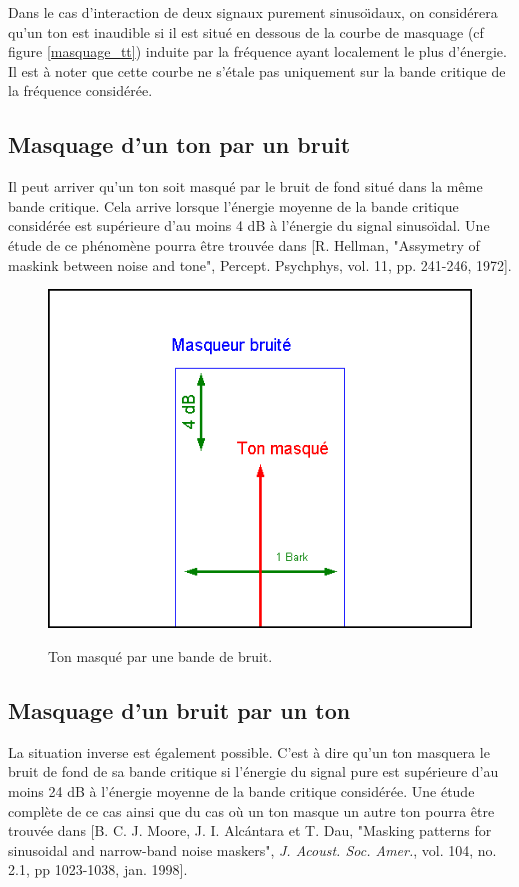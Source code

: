     Dans le cas d'interaction de deux signaux purement sinuso{\"\i}daux,
    on consid{\'e}rera qu'un ton est inaudible si il est situ{\'e} en
    dessous de la courbe de masquage (cf figure \ref{masquage_tt})
    induite par la fr{\'e}quence ayant localement le plus d'{\'e}nergie.
    Il est {\`a} noter que cette courbe ne s'{\'e}tale pas uniquement sur
    la bande critique de la fr{\'e}quence consid{\'e}r{\'e}e.


    \newpage
    \subsection{Masquage d'un ton par un bruit}
    Il peut arriver qu'un ton soit masqu{\'e} par le bruit de fond
    situ{\'e} dans la m{\^e}me bande critique. Cela arrive lorsque
    l'{\'e}nergie moyenne de la bande critique consid{\'e}r{\'e}e est
    sup{\'e}rieure d'au moins 4 dB {\`a} l'{\'e}nergie du signal sinuso{\"\i}dal.
    Une {\'e}tude de ce ph{\'e}nom{\`e}ne pourra {\^e}tre trouv{\'e}e dans [R.
    Hellman, "Assymetry of maskink between noise and tone",
    Percept. Psychphys, vol. 11, pp. 241-246, 1972].

    \begin{figure}[h]
        \centering
        \includegraphics[width=12cm]{figures/masquage_tb.png}\\
        \caption{Ton masqu{\'e} par une bande de bruit.}
        \label{masquage_tb}
    \end{figure}


    \newpage
    \subsection{Masquage d'un bruit par un ton}
    La situation inverse est {\'e}galement possible. C'est {\`a} dire
    qu'un ton masquera le bruit de fond de sa bande critique si
    l'{\'e}nergie du signal pure est sup{\'e}rieure d'au moins 24 dB {\`a}
    l'{\'e}nergie moyenne de la bande critique consid{\'e}r{\'e}e. Une {\'e}tude
    compl{\`e}te de ce cas ainsi que du cas o{\`u} un ton masque un autre
    ton pourra {\^e}tre trouv{\'e}e dans [B. C. J. Moore, J. I.
    Alc\'{a}ntara et T. Dau, "Masking patterns for sinusoidal and
    narrow-band noise maskers", \emph{J. Acoust. Soc. Amer.}, vol.
    104, no. 2.1, pp 1023-1038, jan. 1998].\\

